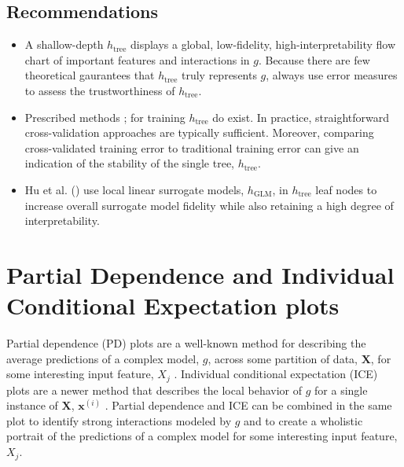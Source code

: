 \documentclass{article}
\begin{document}
\subsection{Recommendations}

\begin{itemize}
	
	\item A shallow-depth $h_{\text{tree}}$ displays a global, low-fidelity, high-interpretability flow chart of important features and interactions in $g$. Because there are few theoretical gaurantees that $h_{\text{tree}}$ truly represents $g$, always use error measures to assess the trustworthiness of $h_{\text{tree}}$.
	
	\item Prescribed methods \cite{dt_surrogate1}; \cite{dt_surrogate2} for training $h_{\text{tree}}$ do exist. In practice, straightforward cross-validation approaches are typically sufficient. Moreover, comparing cross-validated training error to traditional training error can give an indication of the stability of the single tree, $h_{\text{tree}}$.
	
	\item Hu et al. (\citeyear{lime-sup}) use local linear surrogate models, $h_{\text{GLM}}$, in $h_{\text{tree}}$ leaf nodes to increase overall surrogate model fidelity while also retaining a high degree of interpretability.
	
\end{itemize}

\section{Partial Dependence and Individual Conditional Expectation plots}
\label{sec:pd_ice}

Partial dependence (PD) plots are a well-known method for describing the average predictions of a complex model, $g$, across some partition of data, $\mathbf{X}$, for some interesting input feature, $X_j$ \cite{esl}. Individual conditional expectation (ICE) plots are a newer method that describes the local behavior of $g$ for a single instance of $\mathbf{X}$, $\mathbf{x}^{(i)}$ \cite{ice_plots}. Partial dependence and ICE can be combined in the same plot to identify strong interactions modeled by $g$ and to create a wholistic portrait of the predictions of a complex model for some interesting input feature, $X_j$.
\end{document}
